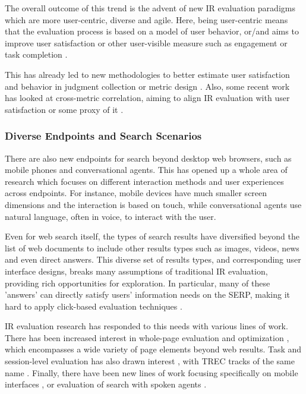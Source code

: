 The overall outcome of this trend is the advent of new IR evaluation paradigms which are more user-centric, diverse and agile. Here, being user-centric means that the evaluation process is based on a model of user behavior, or/and aims to improve user satisfaction or other user-visible measure such as engagement or task completion \citep{scholer13}. 

This has already led to new methodologies to better estimate user satisfaction and behavior in judgment collection \citep{VermaY16, VermaYC16} or metric design \citep{YilmazSCR10, CarteretteKY11, ChapelleMZG09}. Also, some recent work has looked at cross-metric correlation, aiming to align IR evaluation with user satisfaction or some proxy of it \citep{Al-Maskari2007,radl:comp10}.


\subsubsection{Diverse Endpoints and Search Scenarios}

There are also new endpoints for search beyond desktop web browsers, such as mobile phones and conversational agents. This has opened up a whole area of research which focuses on different interaction methods and user experiences across endpoints. For instance, mobile devices have much smaller screen dimensions and the interaction is based on touch, while conversational agents use natural language, often in voice, to interact with the user.

Even for web search itself, the types of search results have diversified beyond the list of web documents to include other results types such as images, videos, news and even direct answers. This diverse set of results types, and corresponding user interface designs, breaks many assumptions of traditional IR evaluation, providing rich opportunities for exploration. In particular, many of these 'answers' can directly satisfy users' information needs on the SERP, making it hard to apply click-based evaluation techniques \citep{Li2009GA,diriye2012leaving}.

IR evaluation research has responded to this needs with various lines of work. There has been increased interest in whole-page evaluation and optimization \citep{Zhou:2012}, which encompasses a wide variety of page elements beyond web results. %
%
Task and session-level evaluation has also drawn interest \citep{KanoulasCCS11, CarteretteKHC14}, with TREC tracks of the same name \citep{carterette2014overview}. Finally, there have been new lines of work focusing specifically on mobile interfaces \citep{VermaYC16}, or evaluation of search with spoken agents \citep{Kiseleva:2016}.

